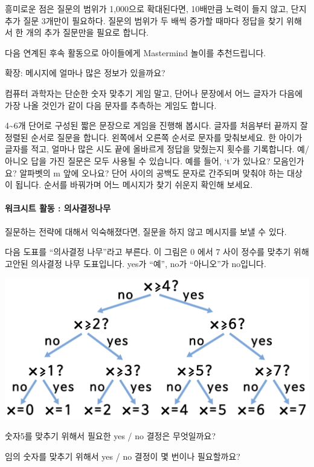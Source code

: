 \documentclass[]{article}
\begin{document}
흥미로운 점은 질문의 범위가 1,000으로 확대된다면, 10배만큼 노력이 들지
않고, 단지 추가 질문 3개만이 필요하다. 질문의 범위가 두 배씩 증가할
때마다 정답을 찾기 위해서 한 개의 추가 질문만을 필요로 합니다.

다음 연계된 후속 활동으로 아이들에게 Mastermind 놀이를 추천드립니다.

확장: 메시지에 얼마나 많은 정보가 있을까요?

컴퓨터 과학자는 단순한 숫자 맞추기 게임 말고, 단어나 문장에서 어느
글자가 다음에 가장 나올 것인가 같이 다음 문자를 추측하는 게임도 합니다.

4\textasciitilde{}6개 단어로 구성된 짧은 문장으로 게임을 진행해 봅시다.
글자를 처음부터 끝까지 잘 정렬된 순서로 질문을 합니다. 왼쪽에서 오른쪽
순서로 문자를 맞춰보세요. 한 아이가 글자를 적고, 얼마나 많은 시도 끝에
올바르게 정답을 맞췄는지 횟수를 기록합니다. 예/아니오 답을 가진 질문은
모두 사용될 수 있습니다. 예를 들어, `t'가 있나요? 모음인가요? 알파벳의 m
앞에 오나요? 단어 사이의 공백도 문자로 간주되며 맞춰야 하는 대상이
됩니다. 순서를 바꿔가며 어느 메시지가 찾기 쉬운지 확인해 보세요.

\mbox{}\paragraph{워크시트 활동 : 의사결정나무}\label{section-83}

질문하는 전략에 대해서 익숙해졌다면, 질문을 하지 않고 메시지를 보낼 수
있다.

다음 도표를 ``의사결정 나무''라고 부른다. 이 그림은 0 에서 7 사이 정수를
맞추기 위해 고안된 의사결정 나무 도표입니다. yes가 ``예'', no가
``아니오''가 no입니다.

\includegraphics{csunplugged/01-part/img/ch05-info/05-info-02-decision-tree.png}

숫자5를 맞추기 위해서 필요한 yes / no 결정은 무엇일까요?

임의 숫자를 맞추기 위해서 yes / no 결정이 몇 번이나 필요할까요?
\end{document}
